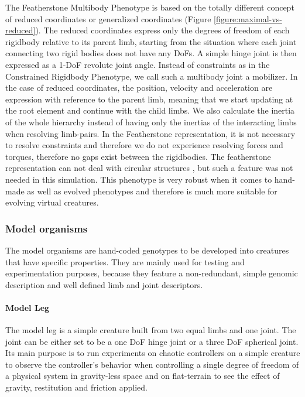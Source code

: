 \documentclass[main]{subfiles}
\begin{document}
The Featherstone Multibody Phenotype is based on the totally different concept of reduced coordinates or generalized coordinates (Figure \ref{figure:maximal-vs-reduced}). %
%
The reduced coordinates express only the degrees of freedom of each rigidbody relative to its parent limb, starting from the situation where each joint connecting two rigid bodies does not have any DoFs. %
%
A simple hinge joint is then expressed as a 1-DoF revolute joint angle. Instead of constraints as in the Constrained Rigidbody Phenotype, we call such a multibody joint a mobilizer. %
%
In the case of reduced coordinates, the position, velocity and acceleration are expression with reference to the parent limb, meaning that we start updating at the root element and continue with the child limbs. %
%
We also calculate the inertia of the whole hierarchy instead of having only the inertias of the interacting limbs when resolving limb-pairs. %
%
In the Featherstone representation, it is not necessary to resolve constraints and therefore we do not experience resolving forces and torques, therefore no gaps exist between the rigidbodies. %
%
The featherstone representation can not deal with circular structures \cite{bib::Coumans2014}, but such a feature was not needed in this simulation. %
%
This phenotype is very robust when it comes to hand-made as well as evolved phenotypes and therefore is much more suitable for evolving virtual creatures. 

\subsubsection{Model organisms}

The model organisms are hand-coded genotypes to be developed into creatures that have specific properties. %
%
They are mainly used for testing and experimentation purposes, because they feature a non-redundant, simple genomic description and well defined limb and joint descriptors.

\paragraph{Model Leg}

The model leg is a simple creature built from two equal limbs and one joint. %
%
The joint can be either set to be a one DoF hinge joint or a three DoF spherical joint. %
%
Its main purpose is to run experiments on chaotic controllers on a simple creature to observe the controller's behavior when controlling a single degree of freedom of a physical system in gravity-less space and on flat-terrain to see the effect of gravity, restitution and friction applied.
\end{document}
